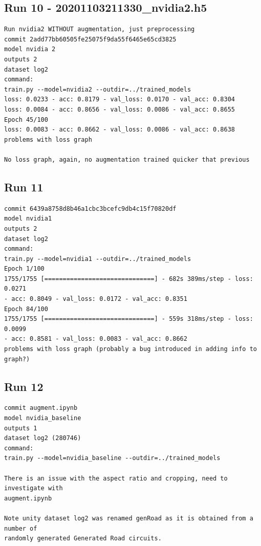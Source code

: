 \subsection{Run 10 - 20201103211330\_nvidia2.h5}
\begin{verbatim}
Run nvidia2 WITHOUT augmentation, just preprocessing
commit 2add77bb60505fe25075f9da55f6465e65cd3825
model nvidia 2
outputs 2
dataset log2
command:
train.py --model=nvidia2 --outdir=../trained_models
loss: 0.0233 - acc: 0.8179 - val_loss: 0.0170 - val_acc: 0.8304
loss: 0.0084 - acc: 0.8656 - val_loss: 0.0086 - val_acc: 0.8655
Epoch 45/100
loss: 0.0083 - acc: 0.8662 - val_loss: 0.0086 - val_acc: 0.8638
problems with loss graph

No loss graph, again, no augmentation trained quicker that previous

\end{verbatim}

\subsection{Run 11}
\begin{verbatim}
commit 6439a8758d8b46a1cbc3bcefc9db4c15f70820df
model nvidia1
outputs 2
dataset log2
command:
train.py --model=nvidia1 --outdir=../trained_models
Epoch 1/100
1755/1755 [==============================] - 682s 389ms/step - loss: 0.0271
- acc: 0.8049 - val_loss: 0.0172 - val_acc: 0.8351
Epoch 84/100
1755/1755 [==============================] - 559s 318ms/step - loss: 0.0099 
- acc: 0.8581 - val_loss: 0.0083 - val_acc: 0.8662
problems with loss graph (probably a bug introduced in adding info to graph?)

\end{verbatim}

\subsection{Run 12}
\begin{verbatim}
commit augment.ipynb
model nvidia_baseline
outputs 1
dataset log2 (280746)
command:
train.py --model=nvidia_baseline --outdir=../trained_models

There is an issue with the aspect ratio and cropping, need to investigate with
augment.ipynb

Note unity dataset log2 was renamed genRoad as it is obtained from a number of
randomly generated Generated Road circuits.

\end{verbatim}

